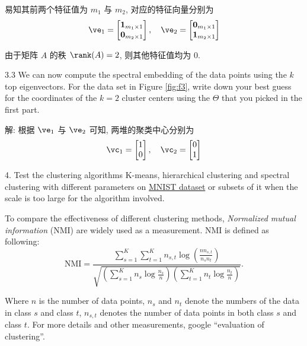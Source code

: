 \documentclass[openany]{ctexbook}
\theoremstyle{kaiti}
\theoremstyle{normal}
\begin{document}
易知其前两个特征值为 $m_1$ 与 $m_2$, 对应的特征向量分别为
\begin{equation}
  \ve_1=\begin{bmatrix}
    \bm{1}_{m_1\times1}\\
    \bm{0}_{m_2\times1}
  \end{bmatrix},\quad
  \ve_2=\begin{bmatrix}
    \bm{0}_{m_1\times1}\\
    \bm{1}_{m_2\times1}
  \end{bmatrix}
\end{equation}

由于矩阵 $A$ 的秩 $\rank(A)=2$, 则其他特征值均为 0.

3.3 We can now compute the spectral embedding of the data points using the $k$ top eigenvectors. For the data set in Figure \ref{fig:f3}, write down your best guess for the coordinates of the $k=2$ cluster centers using the $\Theta$ that you picked in the first part.

解: 根据 $\ve_1$ 与 $\ve_2$ 可知, 两堆的聚类中心分别为
\begin{equation}
  \vc_1=\begin{bmatrix}
    1\\0
  \end{bmatrix},\quad
  \vc_2=\begin{bmatrix}
    0\\1
  \end{bmatrix}
\end{equation}

4. Test the clustering algorithms K-means, hierarchical clustering and spectral clustering with different parameters on \href{http://yann.lecun.com/exdb/mnist/}{MNIST dataset} or subsets of it when the scale is too large for the algorithm involved.

To compare the effectiveness of different clustering methods, \emph{Normalized mutual information} (NMI) are widely used as a measurement. NMI is defined as following:
\begin{equation}
  \text{NMI} = \frac{\displaystyle\sum_{s=1}^{K}\sum_{t=1}^{K}n_{s,t}\log\left(\frac{nn_{s,t}}{n_{s}n_{t}}\right)}{\displaystyle\sqrt{\left(\sum_{s=1}^Kn_{s}\log\frac{n_{s}}{n}\right)\left(\sum_{t=1}^Kn_{t}\log\frac{n_{t}}{n}\right)}}.
\end{equation}

Where $n$ is the number of data points, $n_{s}$ and $n_{t}$ denote the numbers of the data in class $s$ and class $t$, $n_{s,t}$ denotes the number of data points in both class $s$ and class $t$. For more details and other measurements, google ``evaluation of clustering''.
\end{document}
